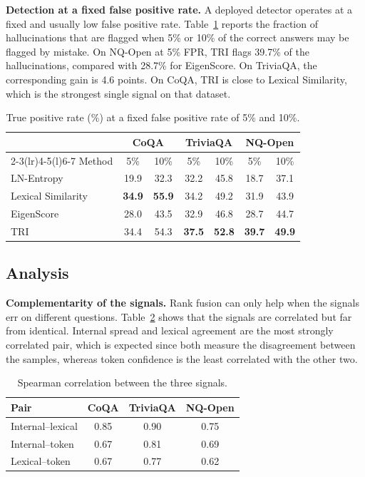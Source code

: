 \documentclass[10pt]{article}
\begin{document}
\textbf{Detection at a fixed false positive rate.} A deployed detector operates at a fixed and usually low false positive rate. Table~\ref{tab:tpr} reports the fraction of hallucinations that are flagged when 5\% or 10\% of the correct answers may be flagged by mistake. On NQ-Open at 5\% FPR, TRI flags 39.7\% of the hallucinations, compared with 28.7\% for EigenScore. On TriviaQA, the corresponding gain is 4.6 points. On CoQA, TRI is close to Lexical Similarity, which is the strongest single signal on that dataset.

\begin{table}[t]
\centering
\caption{True positive rate (\%) at a fixed false positive rate of 5\% and 10\%.}
\label{tab:tpr}
\begin{tabular}{@{}lcccccc@{}}
\toprule
& \multicolumn{2}{c}{CoQA} & \multicolumn{2}{c}{TriviaQA} & \multicolumn{2}{c}{NQ-Open} \\
\cmidrule(lr){2-3}\cmidrule(lr){4-5}\cmidrule(l){6-7}
Method & 5\% & 10\% & 5\% & 10\% & 5\% & 10\% \\
\midrule
LN-Entropy & 19.9 & 32.3 & 32.2 & 45.8 & 18.7 & 37.1 \\
Lexical Similarity & \textbf{34.9} & \textbf{55.9} & 34.2 & 49.2 & 31.9 & 43.9 \\
EigenScore & 28.0 & 43.5 & 32.9 & 46.8 & 28.7 & 44.7 \\
TRI & 34.4 & 54.3 & \textbf{37.5} & \textbf{52.8} & \textbf{39.7} & \textbf{49.9} \\
\bottomrule
\end{tabular}
\end{table}

\subsection{Analysis}\label{sec:analysis}
\textbf{Complementarity of the signals.} Rank fusion can only help when the signals err on different questions. Table~\ref{tab:rho} shows that the signals are correlated but far from identical. Internal spread and lexical agreement are the most strongly correlated pair, which is expected since both measure the disagreement between the samples, whereas token confidence is the least correlated with the other two.

\begin{table}[t]
\centering
\caption{Spearman correlation between the three signals.}
\label{tab:rho}
\small
\begin{tabular}{@{}lccc@{}}
\toprule
Pair & CoQA & TriviaQA & NQ-Open \\
\midrule
Internal--lexical & 0.85 & 0.90 & 0.75 \\
Internal--token & 0.67 & 0.81 & 0.69 \\
Lexical--token & 0.67 & 0.77 & 0.62 \\
\bottomrule
\end{tabular}
\end{table}
\end{document}
